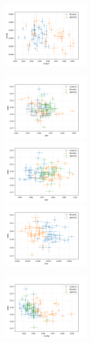 \documentclass[10pt,a4paper,onecolumn]{article}
\theoremstyle{definition}
\theoremstyle{remark}
\begin{document}
\begin{figure}[htpb!]
\begin{multicols}{3}
		\includegraphics[width=0.33\textwidth]{graficos/SCONJ_x_PUNCT.png}  \\
	\end{multicols}\vspace{-0.8cm}
	\begin{multicols}{3}
		\includegraphics[width=0.33\textwidth]{graficos/VERB_x_ADP.png}  \\
		\includegraphics[width=0.33\textwidth]{graficos/VERB_x_ADV.png}  \\
		\includegraphics[width=0.33\textwidth]{graficos/VERB_x_AUX.png}  \\
	\end{multicols}\vspace{-0.8cm}
	\begin{multicols}{3}
		\includegraphics[width=0.33\textwidth]{graficos/VERB_x_CCONJ.png} \\  \\

\end{multicols}
\end{figure}
\end{document}

